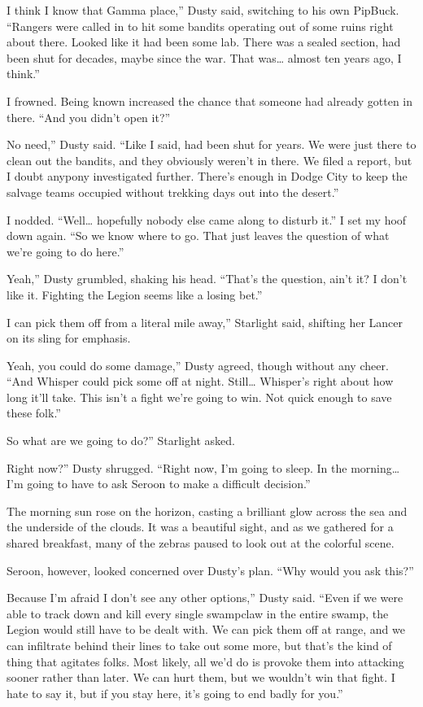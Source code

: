 \leavevmode{}I think I know that Gamma place,” Dusty said, switching to his own PipBuck. “Rangers were called in to hit some bandits operating out of some ruins right about there. Looked like it had been some lab. There was a sealed section, had been shut for decades, maybe since the war. That was… almost ten years ago, I think.”

I frowned. Being known increased the chance that someone had already gotten in there. “And you didn’t open it?”

\leavevmode{}No need,” Dusty said. “Like I said, had been shut for years. We were just there to clean out the bandits, and they obviously weren’t in there. We filed a report, but I doubt anypony investigated further. There’s enough in Dodge City to keep the salvage teams occupied without trekking days out into the desert.”

I nodded. “Well… hopefully nobody else came along to disturb it.” I set my hoof down again. “So we know where to go. That just leaves the question of what we’re going to do here.”

\leavevmode{}Yeah,” Dusty grumbled, shaking his head. “That’s the question, ain’t it? I don’t like it. Fighting the Legion seems like a losing bet.”

\leavevmode{}I can pick them off from a literal mile away,” Starlight said, shifting her Lancer on its sling for emphasis.

\leavevmode{}Yeah, you could do some damage,” Dusty agreed, though without any cheer. “And Whisper could pick some off at night. Still… Whisper’s right about how long it’ll take. This isn’t a fight we’re going to win. Not quick enough to save these folk.”

\leavevmode{}So what are we going to do?” Starlight asked.

\leavevmode{}Right now?” Dusty shrugged. “Right now, I’m going to sleep. In the morning… I’m going to have to ask Seroon to make a difficult decision.”

{\br}%
The morning sun rose on the horizon, casting a brilliant glow across the sea and the underside of the clouds. It was a beautiful sight, and as we gathered for a shared breakfast, many of the zebras paused to look out at the colorful scene.

Seroon, however, looked concerned over Dusty’s plan. “Why would you ask this?”

\leavevmode{}Because I’m afraid I don’t see any other options,” Dusty said. “Even if we were able to track down and kill every single swampclaw in the entire swamp, the Legion would still have to be dealt with. We can pick them off at range, and we can infiltrate behind their lines to take out some more, but that’s the kind of thing that agitates folks. Most likely, all we’d do is provoke them into attacking sooner rather than later. We can hurt them, but we wouldn’t win that fight. I hate to say it, but if you stay here, it’s going to end badly for you.”

